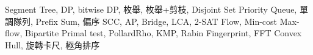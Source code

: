 Segment Tree, DP, bitwise DP, 枚舉, 枚舉+剪枝, Disjoint Set
Priority Queue, 單調隊列, Prefix Sum, 偏序
SCC, AP, Bridge, LCA, 2-SAT
Flow, Min-cost Max-flow, Bipartite
Primal test, PollardRho, KMP, Rabin Fingerprint, FFT
Convex Hull, 旋轉卡尺, 極角排序